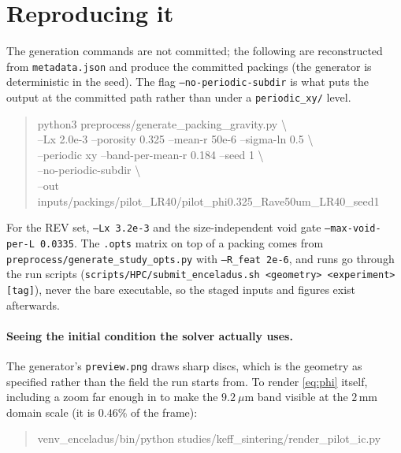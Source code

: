 \documentclass[11pt]{article}
\newcommand{\code}[1]{\texttt{\small #1}}
\begin{document}
\section{Reproducing it}

The generation commands are not committed; the following are reconstructed
from \code{metadata.json} and produce the committed packings (the generator
is deterministic in the seed). The flag
\code{--no-periodic-subdir} is what puts the output at the committed path
rather than under a \code{periodic\_xy/} level.

\begin{quote}\small\ttfamily
python3 preprocess/generate\_packing\_gravity.py \textbackslash \\
\hspace*{2em} --Lx 2.0e-3 --porosity 0.325 --mean-r 50e-6 --sigma-ln 0.5 \textbackslash \\
\hspace*{2em} --periodic xy --band-per-mean-r 0.184 --seed 1 \textbackslash \\
\hspace*{2em} --no-periodic-subdir \textbackslash \\
\hspace*{2em} --out inputs/packings/pilot\_LR40/pilot\_phi0.325\_Rave50um\_LR40\_seed1
\end{quote}

\noindent
For the REV set, \code{--Lx 3.2e-3} and the size-independent void gate
\code{--max-void-per-L 0.0335}. The \code{.opts} matrix on top of a packing
comes from \code{preprocess/generate\_study\_opts.py} with
\code{--R\_feat 2e-6}, and runs go through the run scripts
(\code{scripts/HPC/submit\_enceladus.sh <geometry> <experiment> [tag]}),
never the bare executable, so the staged inputs and figures exist
afterwards.

\paragraph{Seeing the initial condition the solver actually uses.}
The generator's \code{preview.png} draws sharp discs, which is the geometry
as specified rather than the field the run starts from. To render
\eqref{eq:phi} itself, including a zoom far enough in to make the
$9.2\ \mu$m band visible at the $2$\,mm domain scale (it is $0.46\%$ of the
frame):

\begin{quote}\small\ttfamily
venv\_enceladus/bin/python studies/keff\_sintering/render\_pilot\_ic.py
\end{quote}
\end{document}

